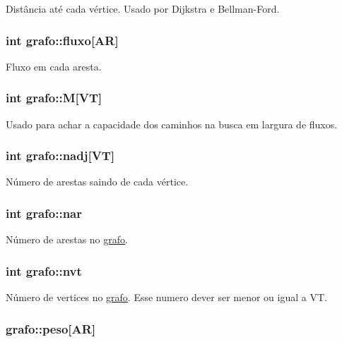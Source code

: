 Distância até cada vértice. Usado por Dijkstra e Bellman-\/Ford. \hypertarget{structgrafo_a1a01117c115b6e46836acee7fecf4404}{
\subsubsection[{fluxo}]{\setlength{\rightskip}{0pt plus 5cm}int {\bf grafo::fluxo}\mbox{[}{\bf AR}\mbox{]}}}
\label{structgrafo_a1a01117c115b6e46836acee7fecf4404}
Fluxo em cada aresta. \hypertarget{structgrafo_acbd9d2d558d6a83e532cdb3bb28462a8}{
\subsubsection[{M}]{\setlength{\rightskip}{0pt plus 5cm}int {\bf grafo::M}\mbox{[}{\bf VT}\mbox{]}}}
\label{structgrafo_acbd9d2d558d6a83e532cdb3bb28462a8}
Usado para achar a capacidade dos caminhos na busca em largura de fluxos. \hypertarget{structgrafo_a450e34672fc91f3110624960dce776d9}{
\subsubsection[{nadj}]{\setlength{\rightskip}{0pt plus 5cm}int {\bf grafo::nadj}\mbox{[}{\bf VT}\mbox{]}}}
\label{structgrafo_a450e34672fc91f3110624960dce776d9}
Número de arestas saindo de cada vértice. \hypertarget{structgrafo_a6d60c28e301f0d721e81a5730d600cdb}{
\subsubsection[{nar}]{\setlength{\rightskip}{0pt plus 5cm}int {\bf grafo::nar}}}
\label{structgrafo_a6d60c28e301f0d721e81a5730d600cdb}
Número de arestas no \hyperlink{structgrafo}{grafo}. \hypertarget{structgrafo_af1120d4d39a8d9461cb14c5698ccc5e9}{
\subsubsection[{nvt}]{\setlength{\rightskip}{0pt plus 5cm}int {\bf grafo::nvt}}}
\label{structgrafo_af1120d4d39a8d9461cb14c5698ccc5e9}
Número de vertices no \hyperlink{structgrafo}{grafo}. Esse numero dever ser menor ou igual a VT. \hypertarget{structgrafo_a9b7c937f400c11fbaabeee69f5bb8d05}{
\subsubsection[{peso}]{ {\bf grafo::peso}\mbox{[}{\bf AR}\mbox{]}}}

